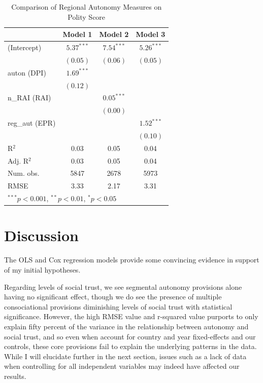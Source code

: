 \documentclass[12pt]{article}
\begin{document}
\begin{table}[!htbp]
	\begin{center}
		\begin{tabular}{l c c c }
			\hline
			& Model 1 & Model 2 & Model 3 \\
			\hline
			(Intercept)       & $5.37^{***}$ & $7.54^{***}$ & $5.26^{***}$ \\
			& $(0.05)$     & $(0.06)$     & $(0.05)$     \\
			auton (DPI)       & $1.69^{***}$ &              &              \\
			& $(0.12)$     &              &              \\
			n\_RAI (RAI)      &              & $0.05^{***}$ &              \\
			&              & $(0.00)$     &              \\
			reg\_aut (EPR)    &              &              & $1.52^{***}$ \\
			&              &              & $(0.10)$     \\
			\hline
			R$^2$             & 0.03         & 0.05         & 0.04         \\
			Adj. R$^2$        & 0.03         & 0.05         & 0.04         \\
			Num. obs.         & 5847         & 2678         & 5973         \\
			RMSE              & 3.33         & 2.17         & 3.31         \\
			\hline
			\multicolumn{4}{l}{\scriptsize{$^{***}p<0.001$, $^{**}p<0.01$, $^*p<0.05$}}
		\end{tabular}
		\caption{Comparison of Regional Autonomy Measures on Polity Score}
		\label{table:coefficients}
	\end{center}
\end{table}

\section{Discussion}
The OLS and Cox regression models provide some convincing evidence in support of my initial hypotheses.

Regarding levels of social trust, we see segmental autonomy provisions alone having no significant effect, though we do see the presence of multiple consociational provisions diminishing levels of social trust with statistical significance. However, the high RMSE value and r-squared value purports to only explain fifty percent of the variance in the relationship between autonomy and social trust, and so even when account for country and year fixed-effects and our controls, these core provisions fail to explain the underlying patterns in the data. While I will elucidate further in the next section, issues such as a lack of data when controlling for all independent variables may indeed have affected our results. 
\end{document}

